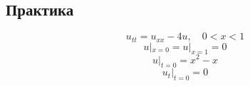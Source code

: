 \subsection{Практика}

\begin{problem}[Владіміров, №20.14.1]
	\begin{equation*}
		u_{tt} = u_{xx} - 4 u, \quad 0 < x < 1
	\end{equation*}
	\begin{equation*}
		u|_{x = 0} = u|_{x = 1} = 0
	\end{equation*}
	\begin{equation*}
		u|_{t = 0} = x^2 - x
	\end{equation*}
	\begin{equation*}
		u_t|_{t = 0} = 0
	\end{equation*}
\end{problem}

